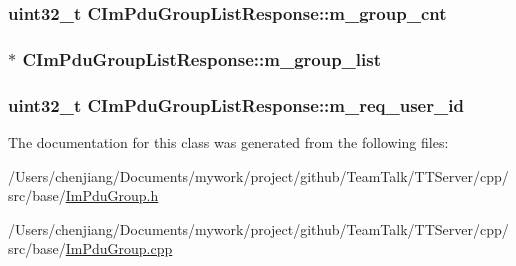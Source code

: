 \subsubsection[{m\+\_\+group\+\_\+cnt}]{\setlength{\rightskip}{0pt plus 5cm}uint32\+\_\+t C\+Im\+Pdu\+Group\+List\+Response\+::m\+\_\+group\+\_\+cnt\hspace{0.3cm}{\ttfamily [private]}}\label{class_c_im_pdu_group_list_response_a69ff98ed42f62f639f03167e0156c336}
\hypertarget{class_c_im_pdu_group_list_response_a599e24661ca9127d155a30f6673d7658}{}
\subsubsection[{m\+\_\+group\+\_\+list}]{$\ast$ C\+Im\+Pdu\+Group\+List\+Response\+::m\+\_\+group\+\_\+list\hspace{0.3cm}{\ttfamily [private]}}\label{class_c_im_pdu_group_list_response_a599e24661ca9127d155a30f6673d7658}
\hypertarget{class_c_im_pdu_group_list_response_abe94fcd0fbfc4f4ccd1111dd90a43ba7}{}
\subsubsection[{m\+\_\+req\+\_\+user\+\_\+id}]{\setlength{\rightskip}{0pt plus 5cm}uint32\+\_\+t C\+Im\+Pdu\+Group\+List\+Response\+::m\+\_\+req\+\_\+user\+\_\+id\hspace{0.3cm}{\ttfamily [private]}}\label{class_c_im_pdu_group_list_response_abe94fcd0fbfc4f4ccd1111dd90a43ba7}


The documentation for this class was generated from the following files\+:\begin{DoxyCompactItemize}
\item 
/\+Users/chenjiang/\+Documents/mywork/project/github/\+Team\+Talk/\+T\+T\+Server/cpp/src/base/\hyperlink{_im_pdu_group_8h}{Im\+Pdu\+Group.\+h}\item 
/\+Users/chenjiang/\+Documents/mywork/project/github/\+Team\+Talk/\+T\+T\+Server/cpp/src/base/\hyperlink{_im_pdu_group_8cpp}{Im\+Pdu\+Group.\+cpp}\end{DoxyCompactItemize}
